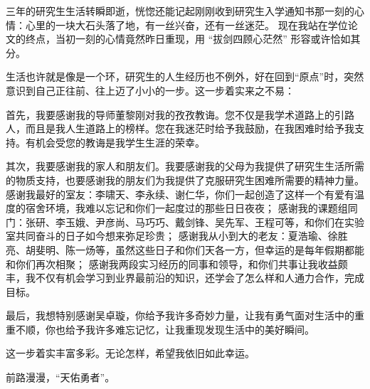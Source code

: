 \cleardoublepage
{}

三年的研究生生活转瞬即逝，恍惚还能记起刚刚收到研究生入学通知书那一刻的心情：心里的一块大石头落了地，有一丝兴奋，还有一丝迷茫。
现在我站在学位论文的终点，当初一刻的心情竟然昨日重现，用 “拔剑四顾心茫然” 形容或许恰如其分。

生活也许就是像是一个环，研究生的人生经历也不例外，好在回到“原点”时，突然意识到自己正往前、往上迈了小小的一步。这一步着实来之不易：

首先，我要感谢我的导师董黎刚对我的孜孜教诲。您不仅是我学术道路上的引路人，而且是我人生道路上的榜样。您在我迷茫时给予我鼓励，在我困难时给予我支持。有机会受您的教诲是我学生生涯的荣幸。

其次，我要感谢我的家人和朋友们。我要感谢我的父母为我提供了研究生生活所需的物质支持，也要感谢我的朋友们为我提供了克服研究生困难所需要的精神力量。
感谢我最好的室友：李啸天、李永续、谢仁华，你们一起创造了这样一个有爱有温度的宿舍环境，我难以忘记和你们一起度过的那些日日夜夜；
感谢我的课题组同门：张研、李玉娥、尹彦尚、马巧巧、戴剑锋、吴先军、王程可等，和你们在实验室共同奋斗的日子如今想来弥足珍贵；
感谢我从小到大的老友：夏浩瑜、徐胜亮、胡斐明、陈一炀等，虽然这些日子和你们天各一方，但幸运的是每年假期都能和你们再次相聚；
感谢我两段实习经历的同事和领导，和你们共事让我收益颇丰，我不仅有机会学习到业界最前沿的知识，还学会了怎么样和人通力合作，完成目标。

最后，我想特别感谢吴卓璇，你给予我许多奇妙力量，让我有勇气面对生活中的重重不顺，你也给予我许多难忘记忆，让我重现发现生活中的美好瞬间。

这一步着实丰富多彩。无论怎样，希望我依旧如此幸运。

前路漫漫，“天佑勇者”。


\newpage